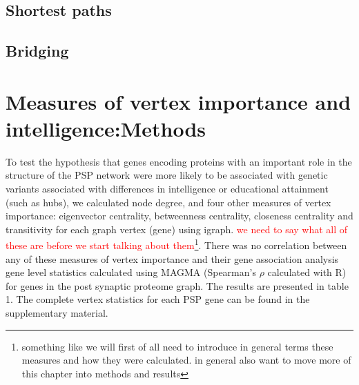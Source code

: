  



\subsection{Shortest paths}


\subsection{Bridging}

\cite{valente2010bridging}
\section{Measures of vertex importance and intelligence:Methods}
\label{sec:Measurs of vertex importance from paper}
To test the hypothesis that genes encoding proteins with an important role in the structure of the PSP network were more likely to be associated with genetic variants associated with differences in intelligence or educational attainment (such as hubs), we calculated node degree, and four other measures of vertex importance: eigenvector centrality, betweenness centrality, closeness centrality and transitivity for each graph vertex (gene) using igraph. \cite{csardi2006igraph} \textcolor{red}{we need to say what all of these are before we start talking about them}\footnote{something like we will first of all need to introduce in general terms these measures and how they were calculated. in general also want to move more of this chapter into methods and results}. There was no correlation between any of these measures of vertex importance and their gene association analysis gene level statistics calculated using MAGMA (Spearman’s $\rho$ calculated with R) for genes in the post synaptic proteome graph. The results are presented in table 1. The complete vertex statistics for each PSP gene can be found in the supplementary material. 
